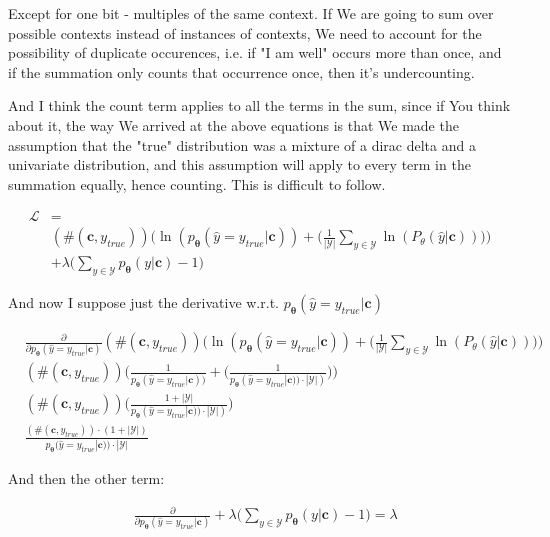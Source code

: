 \documentclass{article}
\newcommand{\vtheta}{\boldsymbol{\theta}}
\newcommand{\model}{p_{\vtheta}}
\newcommand{\context}{\boldsymbol{c}}
\begin{document}
		Except for one bit - multiples of the same context. If We are going to sum over possible contexts instead of instances of contexts, We need to account for the possibility of duplicate occurences, i.e. if "I am well" occurs more than once, and if the summation only counts that occurrence once, then it's undercounting. 
		
		And I think the count term applies to all the terms in the sum, since if You think about it, the way We arrived at the above equations is that We made the assumption that the "true" distribution was a mixture of a dirac delta and a univariate distribution, and this assumption will apply to every term in the summation equally, hence counting. This is difficult to follow.
		
		\begin{align}
			\mathcal{L} &=\\			
			&(\#(\context, y_{true}))\bigg(\ln(\model(\hat{y} = y_{true}|\context)) + \bigg(\frac{1}{|\mathcal{Y}|} \sum_{y\in\mathcal{Y}} \ln(P_\theta(\hat{y} | \context) )\bigg)\bigg) \\
			&+ \lambda\bigg(\sum_{y\in\mathcal{Y}}\model(y|\context) - 1 \bigg)
		\end{align}
		
		And now I suppose just the derivative w.r.t. $\model(\hat{y} = y_{true}|\context)$
		
		\begin{align}
			&\frac{\partial}{\partial \model(\hat{y} = y_{true}|\context)} (\#(\context, y_{true}))\bigg(\ln(\model(\hat{y} = y_{true}|\context)) + \bigg(\frac{1}{|\mathcal{Y}|} \sum_{y\in\mathcal{Y}} \ln(P_\theta(\hat{y} | \context) )\bigg)\bigg)\\
			&(\#(\context, y_{true}))\bigg(\frac{1}{\model(\hat{y} = y_{true}|\context))} + \bigg( \frac{1}{\model(\hat{y} = y_{true}|\context)) \cdot |\mathcal{Y}| )}\bigg)\bigg)\\
			&(\#(\context, y_{true})) \bigg( \frac{1 + |\mathcal{Y}|}{\model(\hat{y} = y_{true}|\context)) \cdot |\mathcal{Y}| )}\bigg)\\
			& \frac{(\#(\context, y_{true}))\cdot (1 + |\mathcal{Y}|)}{\model(\hat{y} = y_{true}|\context)) \cdot |\mathcal{Y}|}
		\end{align}
		
		And then the other term:
		
		\begin{align}
			&\frac{\partial}{\partial \model(\hat{y} = y_{true}|\context)} + \lambda\bigg(\sum_{y\in\mathcal{Y}}\model(y|\context) - 1 \bigg) = \lambda
		\end{align}
		
\end{document}
